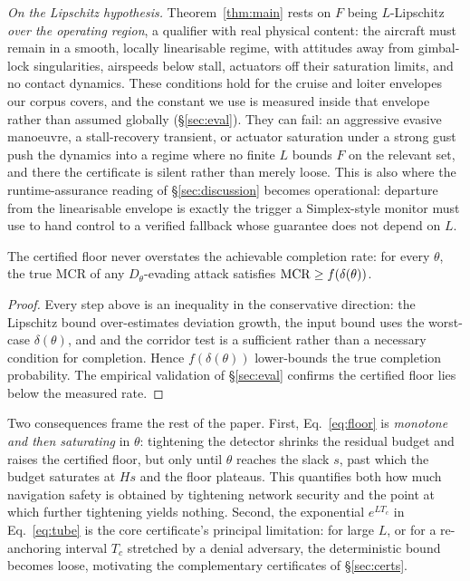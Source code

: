 \emph{On the Lipschitz hypothesis.} Theorem~\ref{thm:main} rests on $F$ being
$L$-Lipschitz \emph{over the operating region}, a qualifier with real physical
content: the aircraft must remain in a smooth, locally linearisable regime, with
attitudes away from gimbal-lock singularities, airspeeds below stall, actuators
off their saturation limits, and no contact dynamics. These conditions hold for
the cruise and loiter envelopes our corpus covers, and the constant we use is
measured inside that envelope rather than assumed globally (\S\ref{sec:eval}).
They can fail: an aggressive evasive manoeuvre, a stall-recovery transient, or
actuator saturation under a strong gust push the dynamics into a regime where no
finite $L$ bounds $F$ on the relevant set, and there the certificate is silent
rather than merely loose. This is also where the runtime-assurance reading of
\S\ref{sec:discussion} becomes operational: departure from the linearisable
envelope is exactly the trigger a Simplex-style monitor must use to hand control
to a verified fallback whose guarantee does not depend on $L$.

\begin{proposition}[Soundness]
\label{prop:sound}
The certified floor never overstates the achievable completion rate: for every
$\theta$, the true MCR of any $D_\theta$-evading attack satisfies
$\mathrm{MCR}\ge f(\delta(\theta))$.
\end{proposition}
\begin{proof}
Every step above is an inequality in the conservative direction: the Lipschitz
bound over-estimates deviation growth, the input bound uses the worst-case
$\delta(\theta)$, and and the corridor test is a sufficient rather than a necessary condition for
completion. Hence $f(\delta(\theta))$ lower-bounds the
true completion probability. The empirical validation of \S\ref{sec:eval}
confirms the certified floor lies below the measured rate.
\end{proof}

Two consequences frame the rest of the paper. First, Eq.~\eqref{eq:floor} is
\emph{monotone and then saturating} in $\theta$: tightening the detector shrinks
the residual budget and raises the certified floor, but only until $\theta$
reaches the slack $s$, past which the budget saturates at $Hs$ and the floor
plateaus. This quantifies both how much navigation safety is obtained by
tightening network security and the point at which further tightening yields
nothing. Second, the exponential
$e^{LT_c}$ in Eq.~\eqref{eq:tube} is the core certificate's principal
limitation: for large $L$, or for a re-anchoring interval $T_c$ stretched by a
denial adversary, the deterministic bound becomes loose, motivating the
complementary certificates of \S\ref{sec:certs}.

